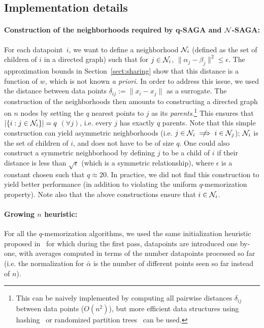 %
%
%
%
%
%
%
%
%
%
%
%
%
%
%


\subsection{Implementation details}

\paragraph{Construction of the neighborhoods required by q-SAGA and ${\cal N}$-SAGA:} 
For each datapoint~$i$, we want to define a neighborhood ${\cal N}_i$ (defined as the set of children of $i$ in a directed graph) such that for $j \in {\cal N}_i$,
$\| \alpha_j - \beta_j \|^2 \le \epsilon$. The approximation bounds in Section~\ref{sect:sharing} show that this distance is a function of $w$, which is not known {\it a priori}. In order to address this issue, we used the distance between data points $\delta_{ij} := \| x_i - x_j \|$ as a surrogate. The construction of the neighborhoods then amounts to constructing a directed graph on $n$ nodes by setting the $q$ nearest points to $j$ as its \emph{parents}.\footnote{This can be naively implemented by computing all pairwise distances $\delta_{ij}$ between data points ($O(n^2)$), but more efficient data structures using hashing~\cite{andoni2018LSH} or randomized partition trees~\cite{dasgupat2015RPT} can be used.} This ensures that $| \{i: j \in {\cal N}_i\}|=q$ $(\forall j)$, i.e. every $j$ has exactly $q$ parents.
Note that this simple construction can yield asymmetric neighborhoods (i.e. $j \in {\cal N}_i \centernot\implies i \in {\cal N}_j$); ${\cal N}_i$ is the set of children of $i$, and does not have to be of size $q$. 
One could also construct a symmetric neighborhood by defining $j$ to be a child of $i$ if their distance is less than $\sqrt{\epsilon}$ (which is a symmetric relationship), where $\epsilon$ is a constant chosen such that $q \approx 20$. In practice, we did not find this construction to yield better performance (in addition to violating the uniform $q$-memorization property). Note also that the above constructions ensure that $i \in {\cal N}_i$.

\paragraph{Growing $n$ heuristic:} For all the $q$-memorization algorithms, we used the same initialization heuristic proposed in~\cite{schmidt2013minimizing,defazio2014} for which during the first pass, datapoints are introduced one by-one, with averages computed in terms of the number datapoints processed so far (i.e. the normalization for $\bar{\alpha}$ is the number of different points seen so far instead of $n$).

%
%
%
%
%
%
%
%
%
%
%
%
%
%
%
%
%
%
%
%
%
%
%
%
%
